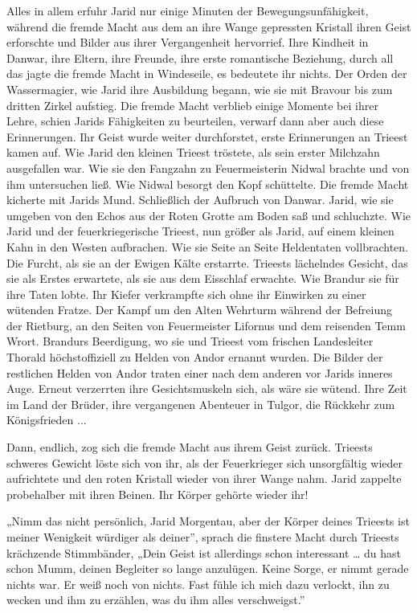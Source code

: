 Alles in allem erfuhr Jarid nur einige Minuten der Bewegungsunfähigkeit, während die fremde Macht aus dem an ihre Wange gepressten Kristall ihren Geist erforschte und Bilder aus ihrer Vergangenheit hervorrief. Ihre Kindheit in Danwar, ihre Eltern, ihre Freunde, ihre erste romantische Beziehung, durch all das jagte die fremde Macht in Windeseile, es bedeutete ihr nichts. Der Orden der Wassermagier, wie Jarid ihre Ausbildung begann, wie sie mit Bravour bis zum dritten Zirkel aufstieg. Die fremde Macht verblieb einige Momente bei ihrer Lehre, schien Jarids Fähigkeiten zu beurteilen, verwarf dann aber auch diese Erinnerungen. Ihr Geist wurde weiter durchforstet, erste Erinnerungen an Trieest kamen auf. Wie Jarid den kleinen Trieest tröstete, als sein erster Milchzahn ausgefallen war. Wie sie den Fangzahn zu Feuermeisterin Nidwal brachte und von ihm untersuchen ließ. Wie Nidwal besorgt den Kopf schüttelte. Die fremde Macht kicherte mit Jarids Mund. Schließlich der Aufbruch von Danwar. Jarid, wie sie umgeben von den Echos aus der Roten Grotte am Boden saß und schluchzte. Wie Jarid und der feuerkriegerische Trieest, nun größer als Jarid, auf einem kleinen Kahn in den Westen aufbrachen. Wie sie Seite an Seite Heldentaten vollbrachten. Die Furcht, als sie an der Ewigen Kälte erstarrte. Trieests lächelndes Gesicht, das sie als Erstes erwartete, als sie aus dem Eisschlaf erwachte. Wie Brandur sie für ihre Taten lobte. Ihr Kiefer verkrampfte sich ohne ihr Einwirken zu einer wütenden Fratze. Der Kampf um den Alten Wehrturm während der Befreiung der Rietburg, an den Seiten von Feuermeister Lifornus und dem reisenden Temm Wrort. Brandurs Beerdigung, wo sie und Trieest vom frischen Landesleiter Thorald höchstoffiziell zu Helden von Andor ernannt wurden. Die Bilder der restlichen Helden von Andor traten einer nach dem anderen vor Jarids inneres Auge. Erneut verzerrten ihre Gesichtsmuskeln sich, als wäre sie wütend. Ihre Zeit im Land der Brüder, ihre vergangenen Abenteuer in Tulgor, die Rückkehr zum Königsfrieden ...

Dann, endlich, zog sich die fremde Macht aus ihrem Geist zurück. Trieests schweres Gewicht löste sich von ihr, als der Feuerkrieger sich unsorgfältig wieder aufrichtete und den roten Kristall wieder von ihrer Wange nahm. Jarid zappelte probehalber mit ihren Beinen. Ihr Körper gehörte wieder ihr!

„Nimm das nicht persönlich, Jarid Morgentau, aber der Körper deines Trieests ist meiner Wenigkeit würdiger als deiner”, sprach die finstere Macht durch Trieests krächzende Stimmbänder, „Dein Geist ist allerdings schon interessant … du hast schon Mumm, deinen Begleiter so lange anzulügen. Keine Sorge, er nimmt gerade nichts war. Er weiß noch von nichts. Fast fühle ich mich dazu verlockt, ihn zu wecken und ihm zu erzählen, was du ihm alles verschweigst.”

